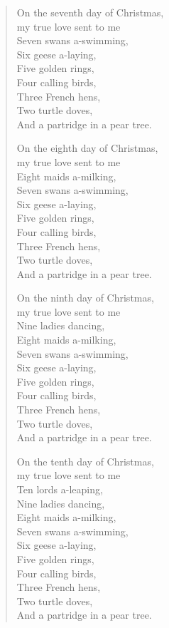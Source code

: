\begin{verse}
\medskip

On the seventh day of Christmas, \\ 
my true love sent to me \\
Seven swans a-swimming, \\
Six geese a-laying, \\
Five golden rings, \\
Four calling birds, \\
Three French hens, \\
Two turtle doves, \\
And a partridge in a pear tree.

\medskip

On the eighth day of Christmas, \\
my true love sent to me \\
Eight maids a-milking, \\
Seven swans a-swimming, \\
Six geese a-laying, \\
Five golden rings, \\
Four calling birds, \\
Three French hens, \\
Two turtle doves, \\
And a partridge in a  pear tree.

\medskip

On the ninth day of Christmas, \\
my true love sent to me \\
Nine ladies dancing, \\
Eight maids a-milking, \\
Seven swans a-swimming, \\
Six geese a-laying, \\
Five golden rings, \\
Four calling birds, \\
Three French hens, \\
Two turtle doves, \\
And a partridge in a pear tree.

\medskip

On the tenth day of Christmas, \\
my true love sent to me \\
Ten lords a-leaping, \\
Nine ladies dancing, \\
Eight maids a-milking, \\
Seven swans a-swimming, \\
Six geese a-laying, \\
Five golden rings, \\
Four calling birds, \\
Three French hens, \\
Two turtle doves, \\
And a partridge in a pear tree.


\end{verse}
